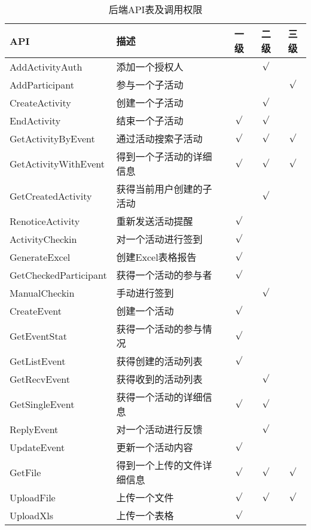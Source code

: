 \begin{table}[htb]
  \centering
  \caption{后端API表及调用权限}
  \label{table:api}
    \begin{tabular}{llccc}
      \toprule
      API & 描述 & 一级 & 二级 & 三级 \\
      \midrule %
      AddActivityAuth 		& 添加一个授权人 			& 	& $\surd$	& \\
      AddParticipant 		& 参与一个子活动 			& 	&  	& $\surd$\\
      CreateActivity 		& 创建一个子活动 			& 	& $\surd$ 	& \\
      EndActivity 			& 结束一个子活动 			& $\surd$	& $\surd$ 	& \\
      GetActivityByEvent 	& 通过活动搜索子活动		& $\surd$	& $\surd$ 	& $\surd$\\
      GetActivityWithEvent 	& 得到一个子活动的详细信息 	& $\surd$	& $\surd$ 	&$\surd$ \\
      GetCreatedActivity 	& 获得当前用户创建的子活动 	& 	& $\surd$ 	& \\
      RenoticeActivity 		& 重新发送活动提醒 			& $\surd$	&  	& \\
      ActivityCheckin 		& 对一个活动进行签到 		& $\surd$	&  	& \\
      GenerateExcel 		& 创建Excel表格报告 		& $\surd$	&  	& \\
      GetCheckedParticipant & 获得一个活动的参与者 		& $\surd$	&  	& \\
      ManualCheckin 		& 手动进行签到 				& 	&  $\surd$	& \\
      CreateEvent 			& 创建一个活动 				& $\surd$	&  	& \\
      GetEventStat 			& 获得一个活动的参与情况 	& $\surd$	&  	& \\
      GetListEvent 			& 获得创建的活动列表 		& $\surd$	&  	& \\
      GetRecvEvent 			& 获得收到的活动列表 		& 	& $\surd$ 	& \\
      GetSingleEvent 		& 获得一个活动的详细信息 	& $\surd$	& $\surd$ 	& \\
      ReplyEvent 			& 对一个活动进行反馈 		& 	&  $\surd$	& \\
      UpdateEvent 			& 更新一个活动内容 			& $\surd$	&  	& \\
      GetFile 				& 得到一个上传的文件详细信息& $\surd$	& $\surd$ 	& $\surd$\\
      UploadFile 		& 上传一个文件 					& $\surd$	& $\surd$ 	& $\surd$\\
      UploadXls 		& 上传一个表格 					& $\surd$	&  	& \\

\end{tabular}
\end{table}
